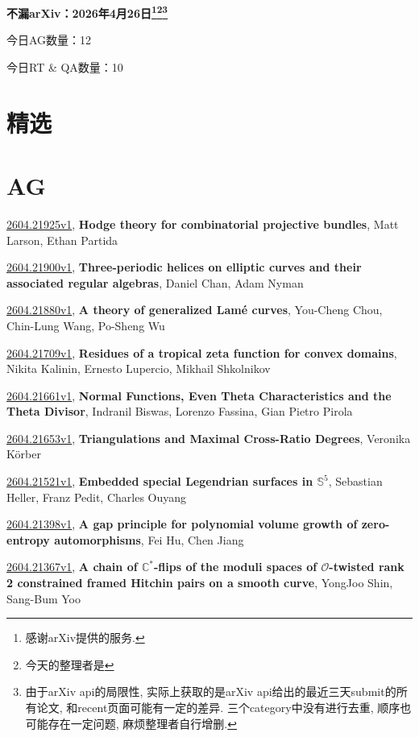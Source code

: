 \documentclass[9pt, a4paper]{article}
\theoremstyle{plain}
\theoremstyle{definition}
\theoremstyle{remark}
\newcommand{\arxiv}[3]{\href{https://arxiv.org/abs/#1}{#1}, \textbf{\textcolor{arxivblue}{#2}}, #3}
\newcommand{\AGnumber}{12}
\newcommand{\RTQAnumber}{10}
\newcommand{\NewestDate}{2026年4月26日}
\newcommand{\todayarXiver}{} %
\begin{document}
\begin{center}
    \Huge\textbf{不漏arXiv：\NewestDate\footnote{感谢arXiv提供的服务.}\footnote{今天的整理者是\todayarXiver}\footnote{由于arXiv api的局限性, 实际上获取的是arXiv api给出的最近三天submit的所有论文, 和recent页面可能有一定的差异. 三个category中没有进行去重, 顺序也可能存在一定问题, 麻烦整理者自行增删.}} \\
\end{center}

\setcounter{section}{-1}

\begin{center}
    今日AG数量：\AGnumber
    
    今日RT \& QA数量：\RTQAnumber
    
\end{center}


\section{精选}


\section{AG}
\arxiv{2604.21925v1}{Hodge theory for combinatorial projective bundles}{Matt Larson, Ethan Partida}

\arxiv{2604.21900v1}{Three-periodic helices on elliptic curves and their associated regular algebras}{Daniel Chan, Adam Nyman}

\arxiv{2604.21880v1}{A theory of generalized Lamé curves}{You-Cheng Chou, Chin-Lung Wang, Po-Sheng Wu}

\arxiv{2604.21709v1}{Residues of a tropical zeta function for convex domains}{Nikita Kalinin, Ernesto Lupercio, Mikhail Shkolnikov}

\arxiv{2604.21661v1}{Normal Functions, Even Theta Characteristics and the Theta Divisor}{Indranil Biswas, Lorenzo Fassina, Gian Pietro Pirola}

\arxiv{2604.21653v1}{Triangulations and Maximal Cross-Ratio Degrees}{Veronika Körber}

\arxiv{2604.21521v1}{Embedded special Legendrian surfaces in $\mathbb S^5$}{Sebastian Heller, Franz Pedit, Charles Ouyang}

\arxiv{2604.21398v1}{A gap principle for polynomial volume growth of zero-entropy automorphisms}{Fei Hu, Chen Jiang}

\arxiv{2604.21367v1}{A chain of $\mathbb{C}^{*}$-flips of the moduli spaces of $\mathcal{O}$-twisted rank 2 constrained framed Hitchin pairs on a smooth curve}{YongJoo Shin, Sang-Bum Yoo}
\end{document}
